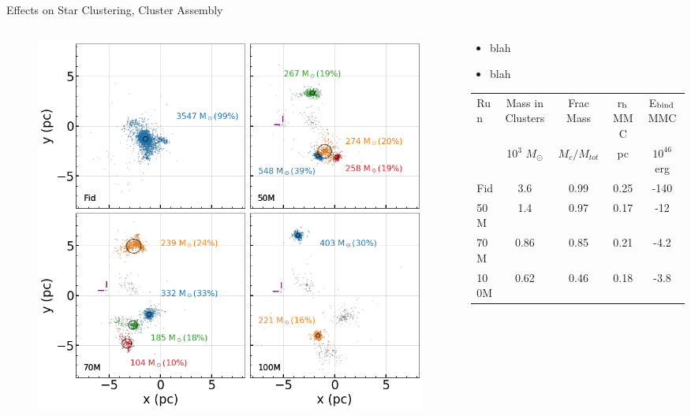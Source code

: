 \documentclass[aspectratio=169]{beamer}
\begin{document}
\begin{frame}{Effects on Star Clustering, Cluster Assembly}{}
    \begin{columns}
        \begin{column}{0.45\textwidth}
            \begin{figure}[h!]
                \centering
                \includegraphics[width=\linewidth]{../images/cluster_grid.png} \\
                \label{fig:cluster_grid}
            \end{figure}
        \end{column}
        \begin{column}{0.45\textwidth}
            \begin{itemize}
              \item blah
              \item blah
            \end{itemize}
	    \begin{table}[!htb]
            	\tiny
 		\label{tab:cluster_stats_2tff}
 		\begin{tabular}{lcccc} 
  			\hline
  			Run & Mass in Clusters & Frac Mass & r$_{\rm h}$ MMC & E$_{\rm bind}$ MMC \\
  			& 10$^3$ $M_{\odot}$ & $M_{c}/M_{tot}$ & pc & $10^{46}$ erg\\
  			\hline
  			Fid & 3.6 & 0.99 & 0.25 & -140 \\
  			50M & 1.4 & 0.97 & 0.17 & -12 \\
  			70M & 0.86 & 0.85 & 0.21 & -4.2 \\
  			100M & 0.62 & 0.46 & 0.18 & -3.8 \\
  			\hline
 		\end{tabular}
	    \end{table}
        \end{column}
    \end{columns}
\end{frame} 
\end{document}
